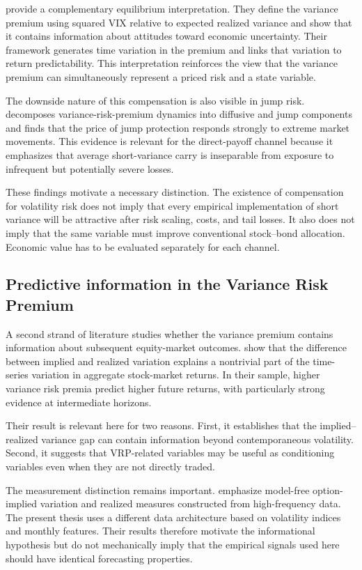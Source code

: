 \textcite{DrechslerYaron2011} provide a complementary equilibrium interpretation. They define the variance premium using squared VIX relative to expected realized variance and show that it contains information about attitudes toward economic uncertainty. Their framework generates time variation in the premium and links that variation to return predictability. This interpretation reinforces the view that the variance premium can simultaneously represent a priced risk and a state variable.

The downside nature of this compensation is also visible in jump risk. \textcite{Todorov2010} decomposes variance-risk-premium dynamics into diffusive and jump components and finds that the price of jump protection responds strongly to extreme market movements. This evidence is relevant for the direct-payoff channel because it emphasizes that average short-variance carry is inseparable from exposure to infrequent but potentially severe losses.

These findings motivate a necessary distinction. The existence of compensation for volatility risk does not imply that every empirical implementation of short variance will be attractive after risk scaling, costs, and tail losses. It also does not imply that the same variable must improve conventional stock--bond allocation. Economic value has to be evaluated separately for each channel.

\subsection{Predictive information in the Variance Risk Premium}

A second strand of literature studies whether the variance premium contains information about subsequent equity-market outcomes. \textcite{BollerslevTauchenZhou2009} show that the difference between implied and realized variation explains a nontrivial part of the time-series variation in aggregate stock-market returns. In their sample, higher variance risk premia predict higher future returns, with particularly strong evidence at intermediate horizons.

Their result is relevant here for two reasons. First, it establishes that the implied--realized variance gap can contain information beyond contemporaneous volatility. Second, it suggests that VRP-related variables may be useful as conditioning variables even when they are not directly traded.

The measurement distinction remains important. \textcite{BollerslevTauchenZhou2009} emphasize model-free option-implied variation and realized measures constructed from high-frequency data. The present thesis uses a different data architecture based on volatility indices and monthly features. Their results therefore motivate the informational hypothesis but do not mechanically imply that the empirical signals used here should have identical forecasting properties.

